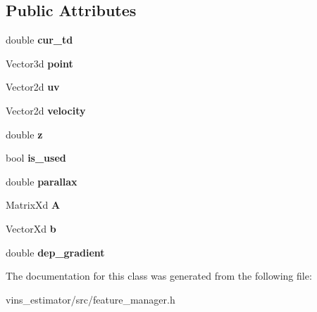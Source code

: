 \subsection*{Public Attributes}
\begin{DoxyCompactItemize}
\item 
\mbox{\label{classFeaturePerFrame_aef53c17e119de3fcb3c6a96d01191466}} 
double {\bfseries cur\+\_\+td}
\item 
\mbox{\label{classFeaturePerFrame_a56959bc588eabfec608c493c967e66ff}} 
Vector3d {\bfseries point}
\item 
\mbox{\label{classFeaturePerFrame_a941c2b2ddec63985ad4e407f2c25c26d}} 
Vector2d {\bfseries uv}
\item 
\mbox{\label{classFeaturePerFrame_a623907bb56adf7282555cd40a4e2b88e}} 
Vector2d {\bfseries velocity}
\item 
\mbox{\label{classFeaturePerFrame_a53028a14c5c86f1ddc21db30163d1419}} 
double {\bfseries z}
\item 
\mbox{\label{classFeaturePerFrame_ada5954a62ff654159b4ecdf4ad621571}} 
bool {\bfseries is\+\_\+used}
\item 
\mbox{\label{classFeaturePerFrame_aab1d553930072630b9bb740956c24cf3}} 
double {\bfseries parallax}
\item 
\mbox{\label{classFeaturePerFrame_a6da340bb3b83dc0687438e32b358d4f5}} 
Matrix\+Xd {\bfseries A}
\item 
\mbox{\label{classFeaturePerFrame_a3816bfa1ab6e64a519a9ed1dabc17a91}} 
Vector\+Xd {\bfseries b}
\item 
\mbox{\label{classFeaturePerFrame_abef75a4dbbd2bcbb436ce3133d663ff1}} 
double {\bfseries dep\+\_\+gradient}
\end{DoxyCompactItemize}


The documentation for this class was generated from the following file\+:\begin{DoxyCompactItemize}
\item 
vins\+\_\+estimator/src/feature\+\_\+manager.\+h\end{DoxyCompactItemize}
